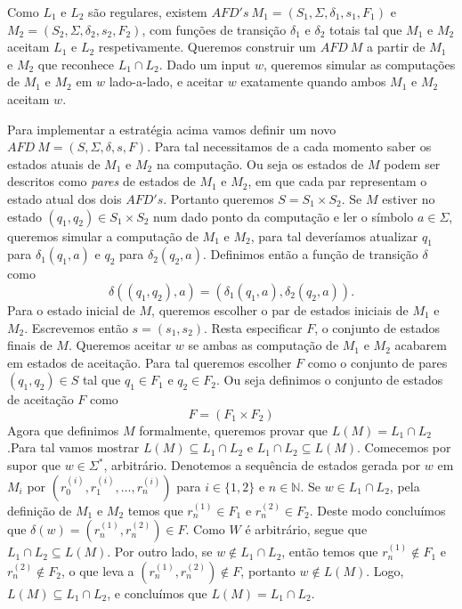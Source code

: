 \documentclass{article}
\begin{document}
Como $L_1$ e $L_2$ são regulares, existem $AFD's \ M_1 = (S_1, \Sigma, \delta_1, s_1, F_1)$ e $M_2 = (S_2, \Sigma, \delta_2, s_2, F_2)$, com funções de transição $\delta_1 $ e $ \delta_2$ totais tal que $M_1$ e $M_2$ aceitam $L_1$ e $L_2$ respetivamente. Queremos construir um $AFD \ M$ a partir de $M_1$ e $M_2$ que reconhece $L_1 \cap L_2$. Dado um input $w$, queremos simular as computações de $M_1$ e $M_2$ em $w$ lado-a-lado, e aceitar $w$ exatamente quando ambos $M_1$ e $M_2$ aceitam $w$.

Para implementar a estratégia acima vamos definir um novo $AFD \ M = (S, \Sigma, \delta, s, F)$. Para tal necessitamos de a cada momento saber os estados atuais de $M_1$ e $M_2$ na computação. Ou seja os estados de $M$ podem ser descritos como \textit{pares} de estados de $M_1$ e $M_2$, em que cada par representam o estado atual dos dois $AFD's$. Portanto queremos $S = S_1 \times S_2$. Se $M$ estiver no estado $(q_1,q_2) \in S_1 \times S_2$ num dado ponto da computação e ler o símbolo $a \in \Sigma$, queremos simular a computação de $M_1$ e $M_2$, para tal deveríamos atualizar $q_1$ para $\delta_1(q_1, a)$ e $q_2$ para $\delta_2(q_2, a)$. Definimos então a função de transição $\delta$ como
\[
  \delta((q_1,q_2),a) = (\delta_1(q_1, a), \delta_2(q_2, a)).
\]
Para o estado inicial de $M$, queremos escolher o par de estados iniciais de $M_1$ e $M_2$. Escrevemos então $s = (s_1,s_2)$. Resta especificar $F$, o conjunto de estados finais de $M$. Queremos aceitar $w$ se ambas as computação de $M_1$ e $M_2$ acabarem em estados de aceitação. Para tal queremos escolher $F$ como o conjunto de pares $(q_1,q_2) \in S$ tal que $q_1 \in F_1 $ e $q_2 \in F_2$. Ou seja definimos o conjunto de estados de aceitação $F$ como
\[
  F = (F_1 \times F_2)
\]
Agora que definimos $M$ formalmente, queremos provar que $L(M) = L_1 \cap L_2$.Para tal vamos mostrar $L(M) \subseteq L_1 \cap L_2$ e $L_1 \cap L_2 \subseteq L(M)$. Comecemos por supor que $w \in \Sigma^\ast$, arbitrário. Denotemos a sequência de estados gerada por $w$ em $M_i$ por $(r_0^{(i)},r_1^{(i)},\dots,r_n^{(i)})$ para $i \in \{1,2\}$ e $n \in \mathbb{N}$. Se $w \in L_1 \cap L_2$, pela definição de $M_1$ e $M_2$ temos que $r_n^{(1)} \in F_1 $ e $r_n^{(2)} \in F_2$. Deste modo concluímos que $\delta(w) = (r_n^{(1)}, r_n^{(2)}) \in F$. Como $W$ é arbitrário, segue que $L_1 \cap L_2 \subseteq L(M)$. Por outro lado, se $w \notin L_1 \cap L_2$, então temos que $r_n^{(1)} \notin F_1 $ e $r_n^{(2)} \notin F_2$, o que leva a $(r_n^{(1)}, r_n^{(2)}) \notin F$, portanto $w \notin L(M)$. Logo, $L(M) \subseteq L_1 \cap L_2$, e concluímos que $L(M) = L_1 \cap L_2$.
\end{document}
